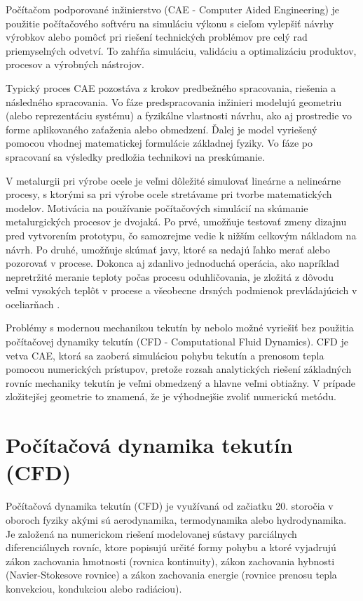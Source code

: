 \documentclass[]{tukediphc}
\begin{document}
Počítačom podporované inžinierstvo (CAE - Computer Aided Engineering) je použitie počítačového softvéru na simuláciu výkonu s cieľom vylepšiť návrhy výrobkov alebo pomôcť pri riešení technických problémov pre celý rad priemyselných odvetví. To zahŕňa simuláciu, validáciu a optimalizáciu produktov, procesov a výrobných nástrojov.

Typický proces CAE pozostáva z krokov predbežného spracovania, riešenia a následného spracovania. Vo fáze predspracovania inžinieri modelujú geometriu (alebo reprezentáciu systému) a fyzikálne vlastnosti návrhu, ako aj prostredie vo forme aplikovaného zaťaženia alebo obmedzení. Ďalej je model vyriešený pomocou vhodnej matematickej formulácie základnej fyziky. Vo fáze po spracovaní sa výsledky predložia technikovi na preskúmanie.

V metalurgii pri výrobe ocele je veľmi dôležité simulovať lineárne a nelineárne procesy, s ktorými sa pri výrobe ocele stretávame pri tvorbe matematických modelov. Motivácia na používanie počítačových simulácií na skúmanie metalurgických procesov je dvojaká. Po prvé, umožňuje testovať zmeny dizajnu pred vytvorením prototypu, čo samozrejme vedie k nižším celkovým nákladom na návrh. Po druhé, umožňuje skúmať javy, ktoré sa nedajú ľahko merať alebo pozorovať v procese. Dokonca aj zdanlivo jednoduchá operácia, ako napríklad nepretržité meranie teploty počas procesu oduhličovania, je zložitá z dôvodu veľmi vysokých teplôt v procese a všeobecne drsných podmienok prevládajúcich v oceliarňach \citep{Ersson2018}.

Problémy s modernou mechanikou tekutín by nebolo možné vyriešiť bez použitia počítačovej dynamiky tekutín (CFD - Computational Fluid Dynamics). CFD je vetva CAE, ktorá sa zaoberá simuláciou pohybu tekutín a prenosom tepla pomocou numerických prístupov, pretože rozsah analytických riešení základných rovníc mechaniky tekutín je veľmi obmedzený a hlavne veľmi obtiažny. V prípade zložitejšej geometrie to znamená, že je výhodnejšie zvoliť numerickú metódu. 

\section{Počítačová dynamika tekutín (CFD)}

Počítačová dynamika tekutín (CFD) je využívaná od začiatku 20. storočia v oboroch fyziky akými sú aerodynamika, termodynamika alebo hydrodynamika. Je založená na numerickom riešení modelovanej sústavy parciálnych diferenciálnych rovníc, ktore popisujú určité formy pohybu a ktoré vyjadrujú zákon zachovania hmotnosti (rovnica kontinuity), zákon zachovania hybnosti (Navier-Stokesove rovnice) a zákon zachovania energie (rovnice prenosu tepla konvekciou, kondukciou alebo radiáciou).
\end{document}
